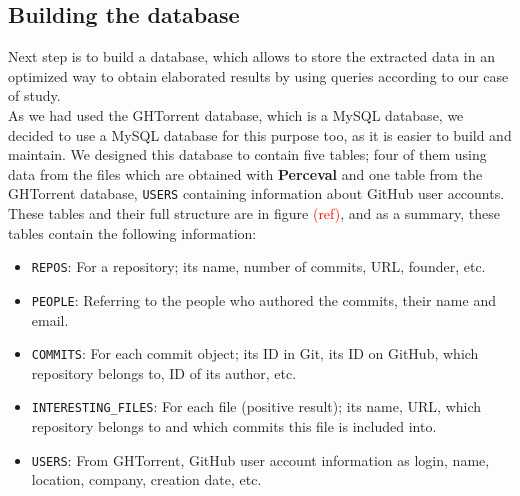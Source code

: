 \documentclass[a4paper, 12pt]{book}
\begin{document}
\subsection{Building the database}
\label{ssec:build-database}
Next step is to build a database, which allows to store the extracted data in an optimized way to
obtain elaborated results by using queries according to our case of study.\\
As we had used the GHTorrent database, which is a MySQL database, we decided to use a MySQL database
for this purpose too, as it is easier to build and maintain.
We designed this database to contain five tables; four of them using data from the files which are obtained with
\textbf{Perceval} and one table from the GHTorrent database, \texttt{USERS} containing information about GitHub user accounts.
These tables and their full structure are in figure \textcolor{red}{(ref)}, and as a summary, these tables contain the following information:
\begin{itemize}
  \item \texttt{REPOS}: For a repository; its name, number of commits, URL, founder, etc.
  \item \texttt{PEOPLE}: Referring to the people who authored the commits, their name and email.
  \item \texttt{COMMITS}: For each commit object; its ID in Git, its ID on GitHub, which repository belongs to, ID of its author, etc.
  \item \texttt{INTERESTING\_FILES}: For each file (positive result); its name, URL, which repository belongs to and which commits this file is included into.
  \item \texttt{USERS}: From GHTorrent, GitHub user account information as login, name, location, company, creation date, etc.
\end{itemize}
\end{document}
